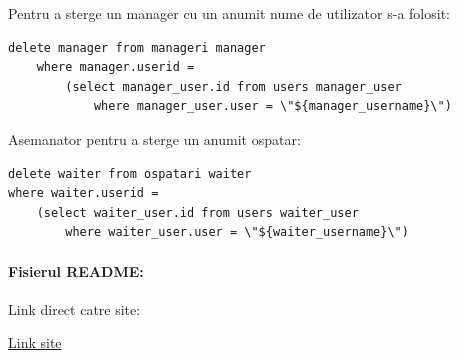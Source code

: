 \documentclass[12pt,english]{article}
\begin{document}
\begin{flushleft}
Pentru a sterge un manager cu un anumit nume de utilizator s-a folosit:
\end{flushleft}

\begin{lstlisting}
delete manager from manageri manager
    where manager.userid = 
        (select manager_user.id from users manager_user
            where manager_user.user = \"${manager_username}\")
\end{lstlisting}

\begin{flushleft}
Asemanator pentru a sterge un anumit ospatar:
\end{flushleft}

\begin{lstlisting}
delete waiter from ospatari waiter
where waiter.userid = 
    (select waiter_user.id from users waiter_user
        where waiter_user.user = \"${waiter_username}\")
\end{lstlisting}

\paragraph{ Fisierul README: }

\begin{center}

\end{center}

\begin{flushleft}
Link direct catre site:
\end{flushleft}

\begin{center}
\href{http://ec2-35-180-32-243.eu-west-3.compute.amazonaws.com:7555}{Link site}
\end{center}
\end{document}
